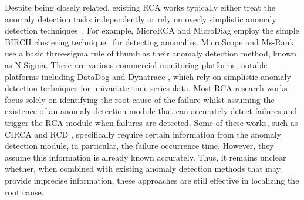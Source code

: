 Despite being closely related, existing RCA works typically either treat the anomaly detection tasks independently or rely on overly simplistic anomaly detection techniques~\cite{lee2023eadro, Soldani2022rcasurvey, Li2022Circa, Azam2022rcd}. For example, MicroRCA \cite{wu2020microrca} and MicroDiag \cite{wu2021microdiag} employ the simple BIRCH clustering technique~\cite{zhang1996birch} for detecting anomalies. MicroScope \cite{Jinjin2018Microscope} and Ms-Rank \cite{Ma2019Msrank} use a basic three-sigma rule of thumb as their anomaly detection method, known as N-Sigma. 
There are various commercial monitoring platforms, notable platforms including DataDog \cite{datadog} and Dynatrace \cite{dynatrace}, which rely on simplistic %
anomaly detection techniques \cite{dynatrace1, datadog2} for univariate time series data. 
Most RCA research works~\cite{Jinjin2018Microscope, Wang2018cloudranger, Ma2019Msrank, wu2020microrca, Ma2020Automap, wu2021microdiag, Li2022Circa, Azam2022rcd, Xin2023CausalRCA} focus solely on identifying the root cause of the failure whilst assuming the existence of an anomaly detection module that can accurately detect failures and trigger the RCA module when failures are detected. Some of these works, such as CIRCA \cite{Li2022Circa} and RCD \cite{Azam2022rcd}, specifically require certain information from the anomaly detection module, in particular, the failure occurrence time. However, they assume this information is already known accurately. Thus, it remains unclear whether, when combined with existing anomaly detection methods that may provide imprecise information, these approaches are still effective in localizing the root cause. 




